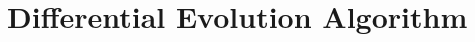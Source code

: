 \documentclass [PhD] {package/uclathes}
\begin{document}



\section{Differential Evolution Algorithm}
\end{document}
